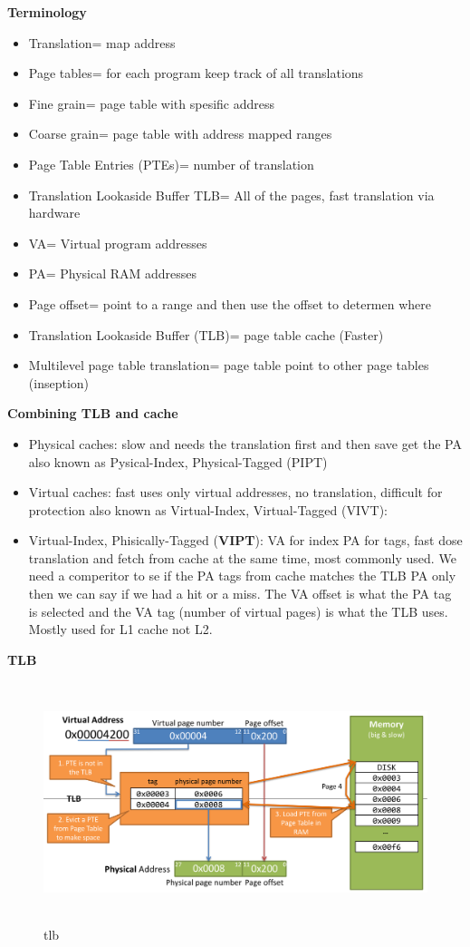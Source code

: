 \textbf{Terminology}
\begin{itemize}
\item  Translation= map address
\item  Page tables= for each program keep track of all translations
\item  Fine grain= page table with spesific address
\item  Coarse grain= page table with address mapped ranges
\item  Page Table Entries (PTEs)= number of translation  
\item  Translation Lookaside Buffer TLB= All of the pages, fast translation via hardware
\item  VA= Virtual program addresses
\item  PA= Physical RAM addresses
\item  Page offset= point to a range and then use the offset to determen where
\item  Translation Lookaside Buffer (TLB)= page table cache (Faster)
\item  Multilevel page table translation= page table point to other page tables (inseption)
\end{itemize}

\newpage

\textbf{Combining TLB and cache}
\begin{itemize}
\item  Physical caches: slow and needs the translation first and then save get the PA
  also known as Pysical-Index, Physical-Tagged (PIPT)
\item  Virtual caches: fast uses only virtual addresses, no translation, difficult for protection
  also known as Virtual-Index, Virtual-Tagged (VIVT):
\item  Virtual-Index, Phisically-Tagged (\textbf{VIPT}): VA for index PA for tags, fast dose translation and
  fetch from cache at the same time, most commonly used.
  We need a comperitor to se if the PA tags from cache matches the TLB PA only then we can say if we had a hit or a miss.
  The VA offset is what the PA tag is selected and the VA tag (number of virtual pages) is what the TLB uses.
  Mostly used for L1 cache not L2.
\end{itemize}

\textbf{TLB}
\begin{figure}[h]
    \vspace{10mm}
    \centering
    \includegraphics[width=16cm, height=7cm]{image/tlb.png}
    \caption{tlb}
\end{figure}


